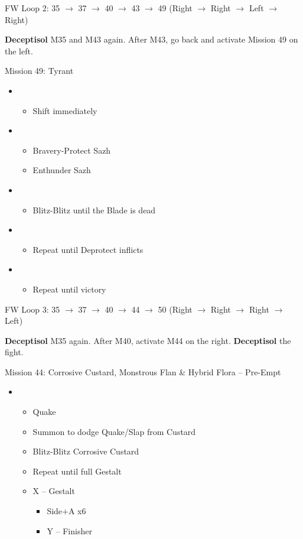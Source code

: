 FW Loop 2: 35 $\rightarrow$ 37 $\rightarrow$ 40 $\rightarrow$ 43 $\rightarrow$ 49 (Right $\rightarrow$ Right $\rightarrow$ Left $\rightarrow$ Right)

\textbf{Deceptisol} M35 and M43 again.
After M43, go back and activate Mission 49 on the left.

\begin{battle}{Mission 49: Tyrant}
	\begin{itemize}
		\item \fourth
			\begin{itemize}
				\item Shift immediately
			\end{itemize}
		\item \third
			\begin{itemize}
				\item Bravery-Protect Sazh
				\item Enthunder Sazh
			\end{itemize}
		\item \second
			\begin{itemize}
				\item Blitz-Blitz until the Blade is dead
			\end{itemize}
		\item \fourth
			\begin{itemize}
				\item Repeat until Deprotect inflicts
			\end{itemize}
		\item \first
			\begin{itemize}
				\item Repeat until victory
			\end{itemize}												
	\end{itemize}
\end{battle}

FW Loop 3: 35 $\rightarrow$ 37 $\rightarrow$ 40 $\rightarrow$ 44 $\rightarrow$ 50 (Right $\rightarrow$ Right $\rightarrow$ Right $\rightarrow$ Left)

\textbf{Deceptisol} M35 again.
After M40, activate M44 on the right.
\textbf{Deceptisol} the fight.

\begin{battle}{{Mission 44: Corrosive Custard, Monstrous Flan \& Hybrid Flora -- Pre-Empt}}
	\begin{itemize}
		\item \fourth
			\begin{itemize}
				\item Quake
				\item Summon to dodge Quake/Slap from Custard
				\item Blitz-Blitz Corrosive Custard
				\item Repeat until full Gestalt
				\item X -- Gestalt
					\begin{itemize}
						\item Side+A x6
						\item Y -- Finisher
					\end{itemize}
			\end{itemize}												
	\end{itemize}
\end{battle}

